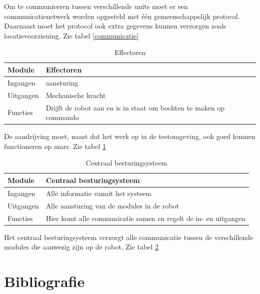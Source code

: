 \documentclass[10pt,a4paper]{article}
\begin{document}
Om te communiceren tussen verschillende units moet er een communicatienetwerk worden opgesteld met \'e\'en gemeenschappelijk protocol. Daarnaast moet het protocol ook extra gegevens kunnen verzorgen zoals locatievoorziening. Zie tabel \ref{communicatie} \\

\begin{table}[H]
\centering
\caption{Effectoren}
\label{Effectoren}
\begin{tabular}{|l|l|}
\hline
Module    & Effectoren \\ \hline
Ingangen  & aansturing  \\ \hline
Uitgangen & Mechanische kracht   \\ \hline
Functies  & Drijft de robot aan en is in staat om bochten te maken op commando            \\ \hline
\end{tabular}
\end{table}

De aandrijving moet, naast dat het werk op in de testomgeving, ook goed kunnen functioneren op mars. Zie tabel \ref{Effectoren} \\

\begin{table}[H]
\centering
\caption{Centraal besturingsysteem}
\label{Centraal besturingsysteem}
\begin{tabular}{|l|l|}
\hline
Module    & Centraal besturingsysteem \\ \hline
Ingangen  & Alle informatie vanuit het systeem  \\ \hline
Uitgangen & Alle aansturing van de modules in de robot \\ \hline
Functies  & Hier komt alle communicatie samen en regelt de in- en uitgangen            \\ \hline
\end{tabular}
\end{table}

Het centraal besturingsysteem verzorgt alle communicatie tussen de verschillende modules die aanwezig zijn op de robot. Zie tabel \ref{Centraal besturingsysteem}

\newpage

\section{Bibliografie}


\end{document}
